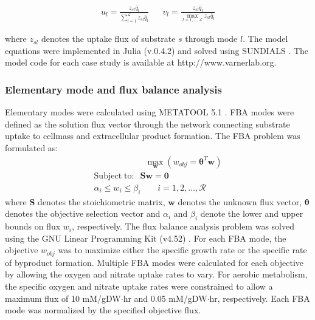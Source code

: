 \documentclass[10pt,twocolumn,twoside,final]{IEEEtran}
\begin{document}
\begin{align*}
	u_{l}  = \frac{z_{sl}\bar{q}_{l}}{\sum\limits_{l = 1}^{\mathcal{L}}z_{sl}\bar{q}_{l}} && v_{l} = \frac{z_{sl}\bar{q}_{l}}{\max\limits_{l=1,\hdots,\mathcal{L}}z_{sl}\bar{q}_{l}}
\end{align*}

where $z_{sl}$ denotes the uptake flux of substrate $s$ through mode $l$.
The model equations were implemented in Julia (v.0.4.2) \cite{Julia} and solved using SUNDIALS \cite{Sundials}.
The model code for each case study is available at http://www.varnerlab.org.



\noindent\subsubsection*{Elementary mode and flux balance analysis}
Elementary modes were calculated using METATOOL 5.1 \cite{2006_vonKamp_Metatool}.
FBA modes were defined as the solution flux vector through the network connecting substrate uptake to cellmass and extracellular product formation.
The FBA problem was formulated as:
\begin{equation}\nonumber
 \begin{multlined}
	\qquad \qquad \qquad \max_{\boldsymbol{w}}{} \! \left( w_{obj} = \mathbf{\boldsymbol{\theta}}^T \boldsymbol{w} \right) \\
	\mathrm{Subject \; to:}
	 \; \; \mathbf{S}\mathbf{w}=\mathbf{0} \\
\alpha_i \leq w_i \leq \beta_i  \qquad i=1,2,\hdots,\mathcal{R}
 \end{multlined}
\end{equation}
where $\mathbf{S}$ denotes the stoichiometric matrix, $\mathbf{w}$ denotes the unknown flux vector, $\boldsymbol{\theta}$ denotes the objective selection vector
and $\alpha_i$ and $\beta_i$ denote the lower and upper bounds on flux $w_{i}$, respectively.
The flux balance analysis problem was solved using the GNU Linear Programming Kit (v4.52) \cite{GLPK}.
For each FBA mode, the objective $w_{obj}$ was to maximize either the specific growth rate or the specific rate of byproduct formation.
Multiple FBA modes were calculated for each objective by allowing the oxygen and nitrate uptake rates to vary.
For aerobic metabolism, the specific oxygen and nitrate uptake rates were constrained to allow a maximum flux of 10 mM/gDW$\cdot$hr and 0.05 mM/gDW$\cdot$hr, respectively.
Each FBA mode was normalized by the specified objective flux.
\end{document}
